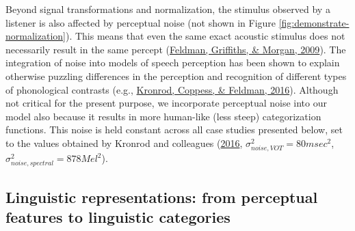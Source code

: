 \documentclass[
  11pt,
  english,
  man,floatsintext]{apa6}
\begin{document}
Beyond signal transformations and normalization, the stimulus observed by a listener is also affected by perceptual noise (not shown in Figure \ref{fig:demonstrate-normalization}). This means that even the same exact acoustic stimulus does not necessarily result in the same percept (\protect\hyperlink{ref-feldman2009}{Feldman, Griffiths, \& Morgan, 2009}). The integration of noise into models of speech perception has been shown to explain otherwise puzzling differences in the perception and recognition of different types of phonological contrasts (e.g., \protect\hyperlink{ref-kronrod2016}{Kronrod, Coppess, \& Feldman, 2016}). Although not critical for the present purpose, we incorporate perceptual noise into our model also because it results in more human-like (less steep) categorization functions. This noise is held constant across all case studies presented below, set to the values obtained by Kronrod and colleagues (\protect\hyperlink{ref-kronrod2016}{2016}, \(\sigma^2_{noise, VOT}=80 msec^2\), \(\sigma^2_{noise, spectral}=878 Mel^2\)).

\hypertarget{sec:representations}{%
\subsection{Linguistic representations: from perceptual features to linguistic categories}\label{sec:representations}}
\end{document}
